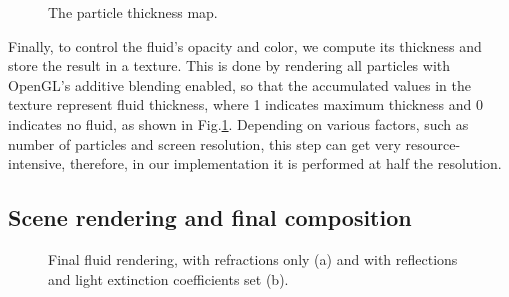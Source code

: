 \begin{figure}[ht!]
    \centering
    \caption{The particle thickness map.}\label{fig:thicknessmap}
\end{figure}
\noindent
Finally, to control the fluid's opacity and color, we compute its thickness and store the result in a texture. This is done by rendering all particles with OpenGL's additive blending enabled, so that the accumulated values in the texture represent fluid thickness, where 1 indicates maximum thickness and 0 indicates no fluid, as shown in Fig.\ref{fig:thicknessmap}. Depending on various factors, such as number of particles and screen resolution, this step can get very resource-intensive, therefore, in our implementation it is performed at half the resolution.

\subsection{Scene rendering and final composition}
\begin{figure}[ht!]
    \centering
        \hfill
    \caption{Final fluid rendering, with refractions only (a) and with reflections and light extinction coefficients set (b).}\label{fig:finalRenders}
\end{figure}

